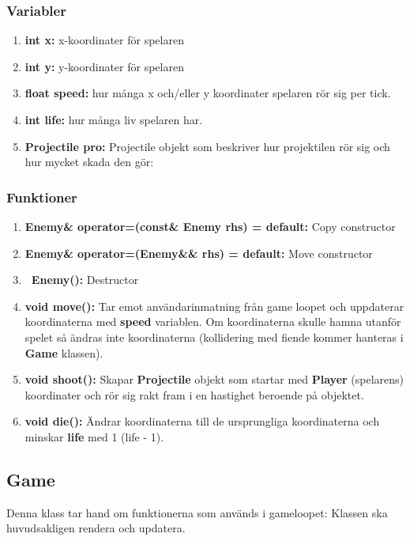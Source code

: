 \documentclass{TDP005mall}
\begin{document}
\subsubsection*{Variabler}
\begin{enumerate}
  \item \textbf{int x{}:} x-koordinater för spelaren
  \item \textbf{int y{}:} y-koordinater för spelaren
  \item \textbf{float speed{}:} hur många x och/eller y koordinater spelaren rör sig per tick.
  \item \textbf{int life{}:} hur många liv spelaren har.
  \item \textbf{Projectile pro{}:} Projectile objekt som beskriver hur projektilen rör sig och hur mycket skada den gör:
\end{enumerate}
\subsubsection*{Funktioner}
\begin{enumerate}
  \item \textbf{Enemy\& operator=(const\& Enemy rhs) = default:} Copy constructor
  \item \textbf{Enemy\& operator=(Enemy\&\& rhs) = default:} Move constructor
  \item \textbf{~Enemy():} Destructor
  \item \textbf{void move():} Tar emot användarinmatning från game loopet och uppdaterar koordinaterna med \textbf{speed} variablen.
    Om koordinaterna skulle hamna utanför spelet så ändras inte koordinaterna (kollidering med fiende kommer hanteras i \textbf{Game} klassen). 
  \item \textbf{void shoot():} Skapar \textbf{Projectile} objekt som startar med \textbf{Player} (spelarens) koordinater och rör sig rakt fram i en hastighet beroende på objektet. 
  \item \textbf{void die():} Ändrar koordinaterna till de ursprungliga koordinaterna och minskar \textbf{life} med 1 (life - 1).
  
\end{enumerate}
\subsection{Game}
Denna klass tar hand om funktionerna som används i gameloopet:
Klassen ska huvudsakligen rendera och updatera.
\end{document}
